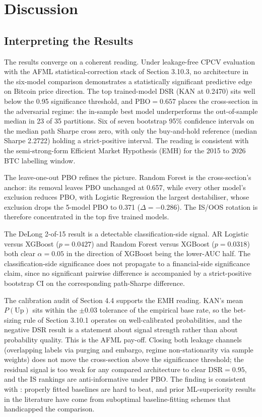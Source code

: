 \newpage
\section{Discussion}\label{sec:discussion}


\subsection{Interpreting the Results}\label{subsec:disc_results}

The results converge on a coherent reading. Under leakage-free CPCV evaluation with the AFML statistical-correction stack of Section 3.10.3, no architecture in the six-model comparison demonstrates a statistically significant predictive edge on Bitcoin price direction. The top trained-model DSR (KAN at 0.2470) sits well below the 0.95 significance threshold, and $\text{PBO} = 0.657$ places the cross-section in the adversarial regime: the in-sample best model underperforms the out-of-sample median in 23 of 35 partitions. Six of seven bootstrap 95\% confidence intervals on the median path Sharpe cross zero, with only the buy-and-hold reference (median Sharpe 2.2722) holding a strict-positive interval. The reading is consistent with the semi-strong-form Efficient Market Hypothesis (EMH) \citep{fama_1970} for the 2015 to 2026 BTC labelling window.

The leave-one-out PBO refines the picture. Random Forest is the cross-section's anchor: its removal leaves PBO unchanged at 0.657, while every other model's exclusion reduces PBO, with Logistic Regression the largest destabiliser, whose exclusion drops the 5-model PBO to 0.371 ($\Delta = -0.286$). The IS/OOS rotation is therefore concentrated in the top five trained models.

The DeLong 2-of-15 result is a detectable classification-side signal. AR Logistic versus XGBoost ($p = 0.0427$) and Random Forest versus XGBoost ($p = 0.0318$) both clear $\alpha = 0.05$ in the direction of XGBoost being the lower-AUC half. The classification-side significance does not propagate to a financial-side significance claim, since no significant pairwise difference is accompanied by a strict-positive bootstrap CI on the corresponding path-Sharpe difference.

The calibration audit of Section 4.4 supports the EMH reading. KAN's mean $P(\text{Up})$ sits within the $\pm 0.03$ tolerance of the empirical base rate, so the bet-sizing rule of Section 3.10.1 operates on well-calibrated probabilities, and the negative DSR result is a statement about signal strength rather than about probability quality. This is the AFML pay-off. Closing both leakage channels (overlapping labels via purging and embargo, regime non-stationarity via sample weights) does not move the cross-section above the significance threshold; the residual signal is too weak for any compared architecture to clear $\text{DSR} = 0.95$, and the IS rankings are anti-informative under PBO. The finding is consistent with \citet{chassot_audrino_2026}: properly fitted baselines are hard to beat, and prior ML-superiority results in the literature have come from suboptimal baseline-fitting schemes that handicapped the comparison.

